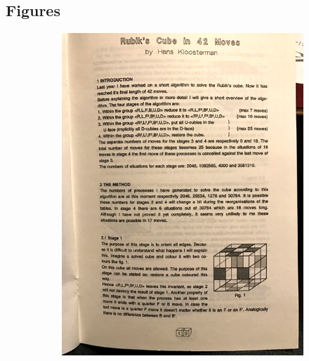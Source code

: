 \documentclass{report}
\begin{document}
\begin{appendices}
		\chapter{Figures}
		\begin{figure}[H]
			\centering
			\begin{subfigure}[b]{0.45\textwidth}
				\includegraphics[width=\textwidth]{Resources/Images/imgKloosterman1.jpg}
			\end{subfigure}
			\hspace{5mm}
			\begin{subfigure}[b]{0.45\textwidth}

\end{subfigure}
\end{figure}
\end{appendices}
\end{document}
